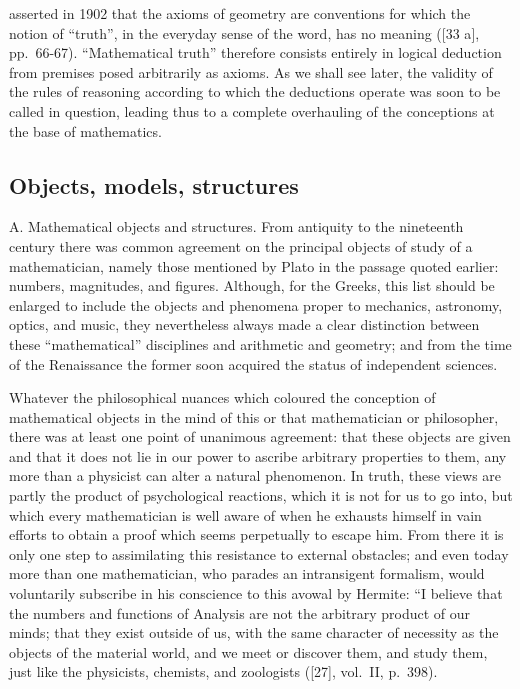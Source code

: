 asserted in 1902 that the axioms of geometry are conventions for which the notion of ``truth'', in the everyday sense of the word, has no meaning ({[}33 a{]}, pp.~66-67). ``Mathematical truth'' therefore consists entirely in logical deduction from premises posed arbitrarily as axioms. As we shall see later, the validity of the rules of reasoning according to which the deductions operate was soon to be called in question, leading thus to a complete overhauling of the conceptions at the base of mathematics.

\subsection*{Objects, models, structures}

A. Mathematical objects and structures. From antiquity to the nineteenth century there was common agreement on the principal objects of study of a mathematician, namely those mentioned by Plato in the passage quoted earlier: numbers, magnitudes, and figures. Although, for the Greeks, this list should be enlarged to include the objects and phenomena proper to mechanics, astronomy, optics, and music, they nevertheless always made a clear distinction between these ``mathematical'' disciplines and arithmetic and geometry; and from the time of the Renaissance the former soon acquired the status of independent sciences.

Whatever the philosophical nuances which coloured the conception of mathematical objects in the mind of this or that mathematician or philosopher, there was at least one point of unanimous agreement: that these objects are given and that it does not lie in our power to ascribe arbitrary properties to them, any more than a physicist can alter a natural phenomenon. In truth, these views are partly the product of psychological reactions, which it is not for us to go into, but which every mathematician is well aware of when he exhausts himself in vain efforts to obtain a proof which seems perpetually to escape him. From there it is only one step to assimilating this resistance to external obstacles; and even today more than one mathematician, who parades an intransigent formalism, would voluntarily subscribe in his conscience to this avowal by Hermite: ``I believe that the numbers and functions of Analysis are not the arbitrary product of our minds; that they exist outside of us, with the same character of necessity as the objects of the material world, and we meet or discover them, and study them, just like the physicists, chemists, and zoologists ({[}27{]}, vol.~II, p.~398).

